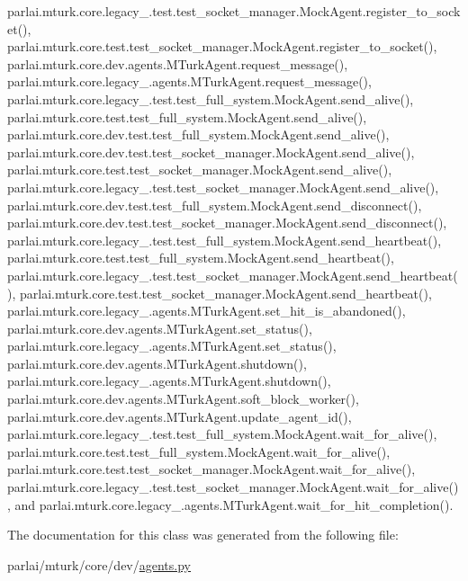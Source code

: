 parlai.\+mturk.\+core.\+legacy\+\_.\+test.\+test\+\_\+socket\+\_\+manager.\+Mock\+Agent.\+register\+\_\+to\+\_\+socket(), parlai.\+mturk.\+core.\+test.\+test\+\_\+socket\+\_\+manager.\+Mock\+Agent.\+register\+\_\+to\+\_\+socket(), parlai.\+mturk.\+core.\+dev.\+agents.\+M\+Turk\+Agent.\+request\+\_\+message(), parlai.\+mturk.\+core.\+legacy\+\_.\+agents.\+M\+Turk\+Agent.\+request\+\_\+message(), parlai.\+mturk.\+core.\+legacy\+\_.\+test.\+test\+\_\+full\+\_\+system.\+Mock\+Agent.\+send\+\_\+alive(), parlai.\+mturk.\+core.\+test.\+test\+\_\+full\+\_\+system.\+Mock\+Agent.\+send\+\_\+alive(), parlai.\+mturk.\+core.\+dev.\+test.\+test\+\_\+full\+\_\+system.\+Mock\+Agent.\+send\+\_\+alive(), parlai.\+mturk.\+core.\+dev.\+test.\+test\+\_\+socket\+\_\+manager.\+Mock\+Agent.\+send\+\_\+alive(), parlai.\+mturk.\+core.\+test.\+test\+\_\+socket\+\_\+manager.\+Mock\+Agent.\+send\+\_\+alive(), parlai.\+mturk.\+core.\+legacy\+\_.\+test.\+test\+\_\+socket\+\_\+manager.\+Mock\+Agent.\+send\+\_\+alive(), parlai.\+mturk.\+core.\+dev.\+test.\+test\+\_\+full\+\_\+system.\+Mock\+Agent.\+send\+\_\+disconnect(), parlai.\+mturk.\+core.\+dev.\+test.\+test\+\_\+socket\+\_\+manager.\+Mock\+Agent.\+send\+\_\+disconnect(), parlai.\+mturk.\+core.\+legacy\+\_.\+test.\+test\+\_\+full\+\_\+system.\+Mock\+Agent.\+send\+\_\+heartbeat(), parlai.\+mturk.\+core.\+test.\+test\+\_\+full\+\_\+system.\+Mock\+Agent.\+send\+\_\+heartbeat(), parlai.\+mturk.\+core.\+legacy\+\_.\+test.\+test\+\_\+socket\+\_\+manager.\+Mock\+Agent.\+send\+\_\+heartbeat(), parlai.\+mturk.\+core.\+test.\+test\+\_\+socket\+\_\+manager.\+Mock\+Agent.\+send\+\_\+heartbeat(), parlai.\+mturk.\+core.\+legacy\+\_.\+agents.\+M\+Turk\+Agent.\+set\+\_\+hit\+\_\+is\+\_\+abandoned(), parlai.\+mturk.\+core.\+dev.\+agents.\+M\+Turk\+Agent.\+set\+\_\+status(), parlai.\+mturk.\+core.\+legacy\+\_.\+agents.\+M\+Turk\+Agent.\+set\+\_\+status(), parlai.\+mturk.\+core.\+dev.\+agents.\+M\+Turk\+Agent.\+shutdown(), parlai.\+mturk.\+core.\+legacy\+\_.\+agents.\+M\+Turk\+Agent.\+shutdown(), parlai.\+mturk.\+core.\+dev.\+agents.\+M\+Turk\+Agent.\+soft\+\_\+block\+\_\+worker(), parlai.\+mturk.\+core.\+dev.\+agents.\+M\+Turk\+Agent.\+update\+\_\+agent\+\_\+id(), parlai.\+mturk.\+core.\+legacy\+\_.\+test.\+test\+\_\+full\+\_\+system.\+Mock\+Agent.\+wait\+\_\+for\+\_\+alive(), parlai.\+mturk.\+core.\+test.\+test\+\_\+full\+\_\+system.\+Mock\+Agent.\+wait\+\_\+for\+\_\+alive(), parlai.\+mturk.\+core.\+test.\+test\+\_\+socket\+\_\+manager.\+Mock\+Agent.\+wait\+\_\+for\+\_\+alive(), parlai.\+mturk.\+core.\+legacy\+\_.\+test.\+test\+\_\+socket\+\_\+manager.\+Mock\+Agent.\+wait\+\_\+for\+\_\+alive(), and parlai.\+mturk.\+core.\+legacy\+\_.\+agents.\+M\+Turk\+Agent.\+wait\+\_\+for\+\_\+hit\+\_\+completion().



The documentation for this class was generated from the following file\+:\begin{DoxyCompactItemize}
\item 
parlai/mturk/core/dev/\hyperlink{parlai_2mturk_2core_2dev_2agents_8py}{agents.\+py}\end{DoxyCompactItemize}
